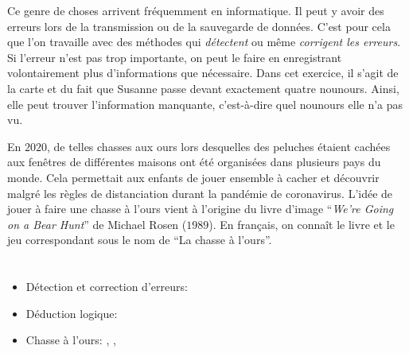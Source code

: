 {{Ce genre de choses arrivent fréquemment en informatique. Il peut y avoir des erreurs lors de la transmission ou de la sauvegarde de données. C’est pour cela que l’on travaille avec des méthodes qui \emph{détectent} ou même \emph{corrigent les erreurs}. Si l’erreur n’est pas trop importante, on peut le faire en enregistrant volontairement plus d’informations que nécessaire. Dans cet exercice, il s’agit de la carte et du fait que Susanne passe devant exactement quatre nounours. Ainsi, elle peut trouver l’information manquante, c’est-à-dire quel nounours elle n’a pas vu.

En $2020$, de telles chasses aux ours lors desquelles des peluches étaient cachées aux fenêtres de différentes maisons ont été organisées dans plusieurs pays du monde. Cela permettait aux enfants de jouer ensemble à cacher et découvrir malgré les règles de distanciation durant la pandémie de coronavirus. L’idée de jouer à faire une chasse à l’ours vient à l’origine du livre d’image “\emph{We’re Going on a Bear Hunt}” de Michael Rosen ($1989$). En français, on connaît le livre et le jeu correspondant sous le nom de “La chasse à l’ours”.



\section*{\BrochureWebsitesAndKeywords}
{\raggedright
\begin{itemize}
  \item Détection et correction d’erreurs: \href{https://fr.wikipedia.org/wiki/Code_correcteur}{}
  \item Déduction logique: \href{https://fr.wikipedia.org/wiki/D\%C3\%A9duction_logique}{}
  \item Chasse à l’ours: \href{https://www.insider.com/coronavirus-pandemic-sparked-worldwide-bear-hunt-to-entertain-kids-2020-4}{}, \href{https://www.actualitte.com/article/zone-51/pendant-toute-la-duree-du-confinement-la-chasse-a-l-ours-est-ouverte/100109}{}, \href{https://www.youtube.com/watch?v=0gyI6ykDwds}{}
\end{itemize}


}}}
